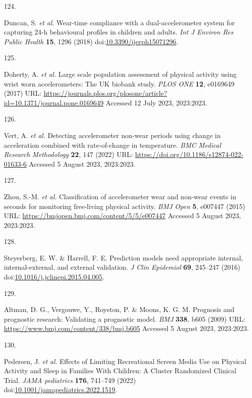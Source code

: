 \documentclass[
  9pt,
]{scrbook}
\newlength{\cslhangindent}
\newlength{\csllabelwidth}
\newlength{\cslentryspacingunit} %
\newenvironment{CSLReferences}[2] %
 {%
  \setlength{\parindent}{0pt}
  \ifodd #1
  \let\oldpar\par
  \def\par{\hangindent=\cslhangindent\oldpar}
  \fi
  \setlength{\parskip}{#2\cslentryspacingunit}
 }%
 {}
\newcommand{\CSLLeftMargin}[1]{\parbox[t]{\csllabelwidth}{#1}}
\newcommand{\CSLRightInline}[1]{\parbox[t]{\linewidth - \csllabelwidth}{#1}\break}
\begin{document}
\begin{CSLReferences}{0}{0}
\leavevmode{}%
\CSLLeftMargin{124. }%
\CSLRightInline{Duncan, S. \emph{et al.} Wear-time compliance with a
dual-accelerometer system for capturing 24-h behavioural profiles in
children and adults. \emph{Int J Environ Res Public Health} \textbf{15},
1296 (2018)
doi:\href{https://doi.org/10.3390/ijerph15071296}{10.3390/ijerph15071296}.}

\leavevmode{}%
\CSLLeftMargin{125. }%
\CSLRightInline{Doherty, A. \emph{et al.} Large scale population
assessment of physical activity using wrist worn accelerometers: The
{UK} biobank study. \emph{{PLOS} {ONE}} \textbf{12}, e0169649 (2017)
URL:
\url{https://journals.plos.org/plosone/article?id=10.1371/journal.pone.0169649}
Accessed 12 July 2023, 2023:2023.}

\leavevmode{}%
\CSLLeftMargin{126. }%
\CSLRightInline{Vert, A. \emph{et al.} Detecting accelerometer non-wear
periods using change in acceleration combined with rate-of-change in
temperature. \emph{{BMC} Medical Research Methodology} \textbf{22}, 147
(2022) URL: \url{https://doi.org/10.1186/s12874-022-01633-6} Accessed 5
August 2023, 2023:2023.}

\leavevmode{}%
\CSLLeftMargin{127. }%
\CSLRightInline{Zhou, S.-M. \emph{et al.} Classification of
accelerometer wear and non-wear events in seconds for monitoring
free-living physical activity. \emph{{BMJ} Open} \textbf{5}, e007447
(2015) URL: \url{https://bmjopen.bmj.com/content/5/5/e007447} Accessed 5
August 2023, 2023:2023.}

\leavevmode{}%
\CSLLeftMargin{128. }%
\CSLRightInline{Steyerberg, E. W. \& Harrell, F. E. Prediction models
need appropriate internal, internal-external, and external validation.
\emph{J Clin Epidemiol} \textbf{69}, 245--247 (2016)
doi:\href{https://doi.org/10.1016/j.jclinepi.2015.04.005}{10.1016/j.jclinepi.2015.04.005}.}

\leavevmode{}%
\CSLLeftMargin{129. }%
\CSLRightInline{Altman, D. G., Vergouwe, Y., Royston, P. \& Moons, K. G.
M. Prognosis and prognostic research: Validating a prognostic model.
\emph{{BMJ}} \textbf{338}, b605 (2009) URL:
\url{https://www.bmj.com/content/338/bmj.b605} Accessed 5 August 2023,
2023:2023.}

\leavevmode{}%
\CSLLeftMargin{130. }%
\CSLRightInline{Pedersen, J. \emph{et al.} Effects of Limiting
Recreational Screen Media Use on Physical Activity and Sleep in Families
With Children: A Cluster Randomized Clinical Trial. \emph{JAMA
pediatrics} \textbf{176}, 741--749 (2022)
doi:\href{https://doi.org/10.1001/jamapediatrics.2022.1519}{10.1001/jamapediatrics.2022.1519}.}


\end{CSLReferences}
\end{document}
